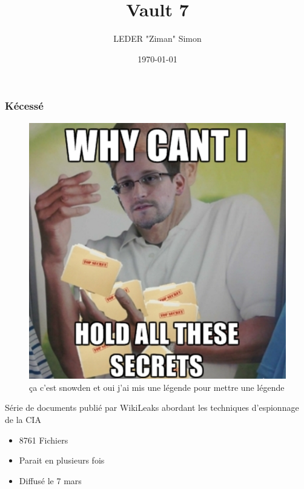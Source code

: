\documentclass{beamer}
\title{Vault 7}
\author{LEDER "Ziman" Simon}
\institute{Rezoleo\\}
\date{\today}
\begin{document}
	
	\begin{frame}
		\titlepage
	\end{frame}
	
	\begin{frame}
		\frametitle{Kécessé}
			\begin{figure}
				\includegraphics[scale=0.20]{snowden.png}
				\caption{ça c'est snowden et oui j'ai mis une légende pour mettre une légende}
			\end{figure}
			Série de documents publié par WikiLeaks abordant les techniques d'espionnage de la CIA
			\begin{itemize}
				\item[\textbullet] 8761 Fichiers
				\item[\textbullet] Parait en plusieurs fois
				\item[\textbullet] Diffusé le 7 mars
			\end{itemize}
		\end{frame}
		
\end{document}
